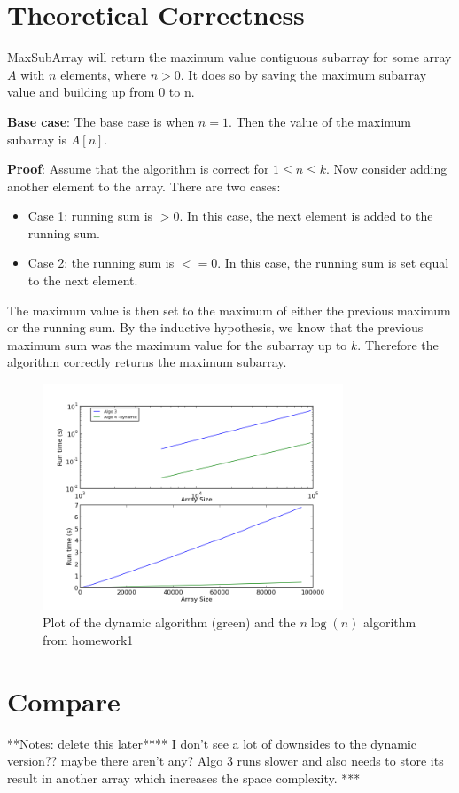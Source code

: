 \documentclass[a4paper,12pt]{article}
\begin{document}
\section*{Theoretical Correctness}

MaxSubArray will return the maximum value contiguous subarray for some array $A$ with $n$ elements, where $n>0$. It does so by saving the maximum subarray value and building up from 0 to n. 

\textbf{Base case}: The base case is when $n=1$. Then the value of the maximum subarray is $A[n]$.

\textbf{Proof}: Assume that the algorithm is correct for $1\leq n \leq k$. Now consider adding another element to the array. There are two cases:

\begin{itemize}


\item Case 1: running sum is $> 0$. In this case, the next element is added to the running sum.

\item Case 2: the running sum is $<= 0$. In this case, the running sum is set equal to the next element. 

\end{itemize}

The maximum value is then set to the maximum of either the previous maximum or the running sum. By the inductive hypothesis, we know that the previous maximum sum was the maximum value for the subarray up to $k$. Therefore the algorithm correctly returns the maximum subarray.


\pagebreak
 
\begin{figure}[h!]
\centering
\includegraphics[width=0.8\textwidth]{algo4runtime}
\caption{Plot of the dynamic algorithm (green) and the $n\log(n)$ algorithm from homework1}
\end{figure} 

\section*{Compare}


**Notes: delete this later**** I don't see a lot of downsides to the dynamic version?? maybe there aren't any?  Algo 3 runs slower and also needs to store its result in another array which increases the space complexity. ***
\end{document}
